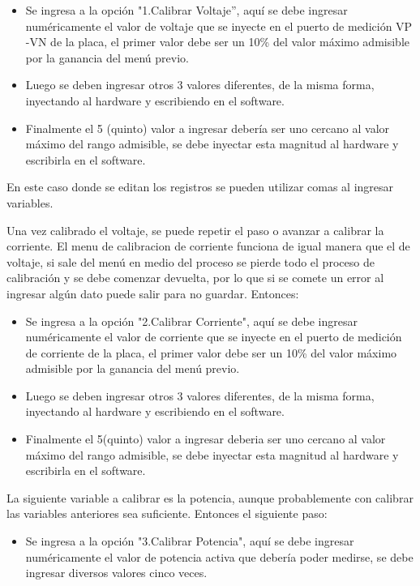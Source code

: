 \begin{itemize}
\item Se ingresa a la opción "1.Calibrar Voltaje”, aquí se debe ingresar numéricamente el valor de voltaje que se inyecte en el puerto de medición VP -VN de la placa, el primer valor debe ser un 10\% del valor máximo admisible por la ganancia del menú previo.
\item Luego se deben ingresar otros 3 valores diferentes, de la misma forma, inyectando al hardware y escribiendo en el software.
\item Finalmente el 5 (quinto) valor a ingresar debería ser uno cercano al valor máximo del rango admisible, se debe inyectar esta magnitud al hardware y escribirla en el software.
\end{itemize}

En este caso donde se editan los registros se pueden utilizar comas al ingresar variables.

Una vez calibrado el voltaje, se puede repetir el paso o avanzar a calibrar la corriente. El menu de calibracion de corriente funciona de igual manera que el de voltaje, si sale del menú en medio del proceso se pierde todo el proceso de calibración y se debe comenzar devuelta, por lo que si se comete un error al ingresar algún dato puede salir para no guardar. Entonces:

\begin{itemize}
\item Se ingresa a la opción "2.Calibrar Corriente", aquí se debe ingresar numéricamente el valor de corriente que se inyecte en el puerto de medición de corriente de la placa, el primer valor debe ser un 10\% del valor máximo admisible por la ganancia del menú previo.

\item Luego se deben ingresar otros 3 valores diferentes, de la misma forma, inyectando al hardware y escribiendo en el software.

\item Finalmente el 5(quinto) valor a ingresar deberia ser uno cercano al valor máximo del rango admisible, se debe inyectar esta magnitud al hardware y escribirla en el software.
\end{itemize}

La siguiente variable a calibrar es la potencia,  aunque probablemente con calibrar las variables anteriores sea suficiente. Entonces el siguiente paso:

\begin{itemize}
\item Se ingresa a la opción "3.Calibrar Potencia", aquí se debe ingresar numéricamente el valor de potencia activa que debería poder medirse, se debe ingresar diversos valores cinco veces.
\end{itemize}

